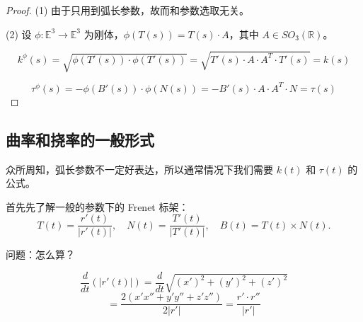 \documentclass[lang=cn,10pt,thmcnt=section]{elegantbook}
\begin{document}
    \begin{proof}
    (1) 由于只用到弧长参数，故而和参数选取无关。
    
    (2) 设 $\phi: \mathbb{E}^3 \rightarrow \mathbb{E}^3$ 为刚体，$\phi(T(s)) = T(s) \cdot A$，其中 $A \in SO_3(\mathbb{R})$。
    
    \[
    k^\phi(s) = \sqrt{\phi(T'(s)) \cdot \phi(T'(s))} = \sqrt{T'(s) \cdot A \cdot A^T \cdot T'(s)} = k(s)
    \]
    
    \[
    \tau^\phi(s) = -\phi(B'(s)) \cdot \phi(N(s)) = -B'(s) \cdot A \cdot A^T \cdot N = \tau(s)
    \]
\end{proof}
\subsection{曲率和挠率的一般形式}
众所周知，弧长参数不一定好表达，所以通常情况下我们需要 $k(t)$ 和 $\tau(t)$ 的公式。

首先先了解一般的参数下的 Frenet 标架：
\[
T(t) = \frac{r'(t)}{|r'(t)|}, \quad N(t) = \frac{T'(t)}{|T'(t)|}, \quad B(t) = T(t) \times N(t).
\]

问题：怎么算？
\begin{theorem}[Frenet标架的导数]
    \[
    \frac{d}{dt}(|r'(t)|) = \frac{d}{dt}\sqrt{(x')^2 + (y')^2 + (z')^2}
    \]
    \[
    = \frac{2(x'x'' + y'y'' + z'z'')}{2|r'|} = \frac{r' \cdot r''}{|r'|}
    \]
    \end{theorem}
    
\end{document}

